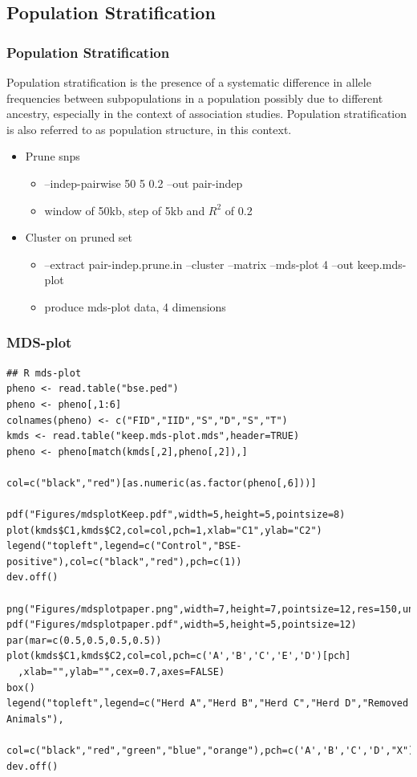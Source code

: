 \documentclass[pdf]{beamer}
\begin{document}
\subsection{Population Stratification}
\begin{frame}
\frametitle{Population Stratification}
Population stratification is the presence of a systematic difference in allele frequencies between subpopulations in a population possibly due to different ancestry, especially in the context of association studies. Population stratification is also referred to as population structure, in this context.
\vspace{0.2in}
\begin{itemize}
\item Prune snps
\begin{itemize}
\item --indep-pairwise 50 5 0.2 --out pair-indep
\item window of 50kb, step of 5kb and $R^2$ of 0.2
\end{itemize}
\item Cluster on pruned set
\begin{itemize}
\item --extract pair-indep.prune.in --cluster --matrix --mds-plot 4 --out keep.mds-plot
\item produce mds-plot data, 4 dimensions 
\end{itemize}
\end{itemize}
\end{frame}

\begin{frame}[fragile]
\frametitle{MDS-plot}
\begin{tiny}
\begin{verbatim}
## R mds-plot
pheno <- read.table("bse.ped")
pheno <- pheno[,1:6]
colnames(pheno) <- c("FID","IID","S","D","S","T")
kmds <- read.table("keep.mds-plot.mds",header=TRUE)
pheno <- pheno[match(kmds[,2],pheno[,2]),]

col=c("black","red")[as.numeric(as.factor(pheno[,6]))]

pdf("Figures/mdsplotKeep.pdf",width=5,height=5,pointsize=8)
plot(kmds$C1,kmds$C2,col=col,pch=1,xlab="C1",ylab="C2")
legend("topleft",legend=c("Control","BSE-positive"),col=c("black","red"),pch=c(1))
dev.off()

png("Figures/mdsplotpaper.png",width=7,height=7,pointsize=12,res=150,units="in")
pdf("Figures/mdsplotpaper.pdf",width=5,height=5,pointsize=12)
par(mar=c(0.5,0.5,0.5,0.5))
plot(kmds$C1,kmds$C2,col=col,pch=c('A','B','C','E','D')[pch]
  ,xlab="",ylab="",cex=0.7,axes=FALSE)
box()
legend("topleft",legend=c("Herd A","Herd B","Herd C","Herd D","Removed Animals"),
  col=c("black","red","green","blue","orange"),pch=c('A','B','C','D',"X"),cex=0.7)
dev.off()
\end{verbatim}
\end{tiny}
\end{frame}
\end{document}

